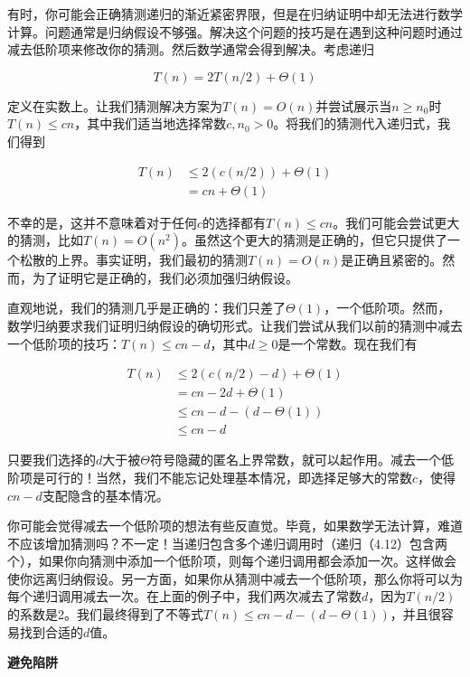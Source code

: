 \documentclass[lang=cn,newtx,10pt,scheme=chinese]{elegantbook}
\begin{document}
有时，你可能会正确猜测递归的渐近紧密界限，但是在归纳证明中却无法进行数学计算。问题通常是归纳假设不够强。解决这个问题的技巧是在遇到这种问题时通过减去低阶项来修改你的猜测。然后数学通常会得到解决。考虑递归

\begin{equation}
T(n)=2 T(n / 2)+\Theta(1)
\end{equation}

定义在实数上。让我们猜测解决方案为$T(n)=O(n)$并尝试展示当$n \geq n_0$时$T(n) \leq c n$，其中我们适当地选择常数$c, n_0>0$。将我们的猜测代入递归式，我们得到

$$
\begin{aligned}
T(n) & \leq 2(c(n / 2))+\Theta(1) \\
& =c n+\Theta(1)
\end{aligned}
$$

不幸的是，这并不意味着对于任何$c$的选择都有$T(n) \leq c n$。我们可能会尝试更大的猜测，比如$T(n)=O\left(n^2\right)$。虽然这个更大的猜测是正确的，但它只提供了一个松散的上界。事实证明，我们最初的猜测$T(n)=O(n)$是正确且紧密的。然而，为了证明它是正确的，我们必须加强归纳假设。

直观地说，我们的猜测几乎是正确的：我们只差了$\Theta(1)$，一个低阶项。然而，数学归纳要求我们证明归纳假设的确切形式。让我们尝试从我们以前的猜测中减去一个低阶项的技巧：$T(n) \leq c n-d$，其中$d \geq 0$是一个常数。现在我们有

$$
\begin{aligned}
T(n) & \leq 2(c(n / 2)-d)+\Theta(1) \\
& =c n-2 d+\Theta(1) \\
& \leq c n-d-(d-\Theta(1)) \\
& \leq c n-d
\end{aligned}
$$

只要我们选择的$d$大于被$\Theta$符号隐藏的匿名上界常数，就可以起作用。减去一个低阶项是可行的！当然，我们不能忘记处理基本情况，即选择足够大的常数$c$，使得$c n-d$支配隐含的基本情况。

你可能会觉得减去一个低阶项的想法有些反直觉。毕竟，如果数学无法计算，难道不应该增加猜测吗？不一定！当递归包含多个递归调用时（递归（4.12）包含两个），如果你向猜测中添加一个低阶项，则每个递归调用都会添加一次。这样做会使你远离归纳假设。另一方面，如果你从猜测中减去一个低阶项，那么你将可以为每个递归调用减去一次。在上面的例子中，我们两次减去了常数$d$，因为$T(n/2)$的系数是2。我们最终得到了不等式$T(n) \leq c n-d-(d-\Theta(1))$，并且很容易找到合适的$d$值。

\textbf{避免陷阱}
\end{document}
